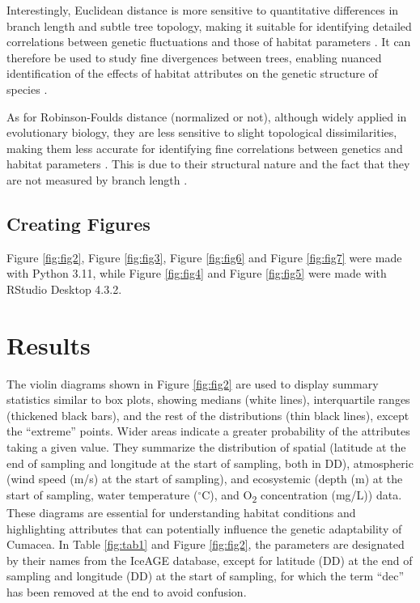 {Interestingly, Euclidean distance is more sensitive to quantitative differences in branch length and subtle tree topology, making it suitable for identifying detailed correlations between genetic fluctuations and those of habitat parameters \citep{czarna2006topology, choi2009comparison}. It can therefore be used to study fine divergences between trees, enabling nuanced identification of the effects of habitat attributes on the genetic structure of species \citep{czarna2006topology, choi2009comparison}.

As for Robinson-Foulds distance (normalized or not), although widely applied in evolutionary biology, they are less sensitive to slight topological dissimilarities, making them less accurate for identifying fine correlations between genetics and habitat parameters \citep{smith2019bayesian, smith2020information}. This is due to their structural nature and the fact that they are not measured by branch length \citep{smith2019bayesian, smith2020information}.

\subsection{Creating Figures}\label{Figures}
Figure \ref{fig:fig2}, Figure \ref{fig:fig3}, Figure \ref{fig:fig6} and Figure \ref{fig:fig7} were made with Python 3.11, while Figure \ref{fig:fig4} and Figure \ref{fig:fig5} were made with RStudio Desktop 4.3.2.

\section{Results}\label{results}
The violin diagrams shown in Figure \ref{fig:fig2} are used to display summary statistics similar to box plots, showing medians (white lines), interquartile ranges (thickened black bars), and the rest of the distributions (thin black lines), except the ``extreme'' points. Wider areas indicate a greater probability of the attributes taking a given value. They summarize the distribution of spatial (latitude at the end of sampling and longitude at the start of sampling, both in DD), atmospheric (wind speed (m/s) at the start of sampling), and ecosystemic (depth (m) at the start of sampling, water temperature ($^\circ$C), and O\textsubscript{2} concentration (mg/L)) data. These diagrams are essential for understanding habitat conditions and highlighting attributes that can potentially influence the genetic adaptability of Cumacea. In Table \ref{fig:tab1} and Figure \ref{fig:fig2}, the parameters are designated by their names from the IceAGE database, except for latitude (DD) at the end of sampling and longitude (DD) at the start of sampling, for which the term ``dec'' has been removed at the end to avoid confusion.

}
